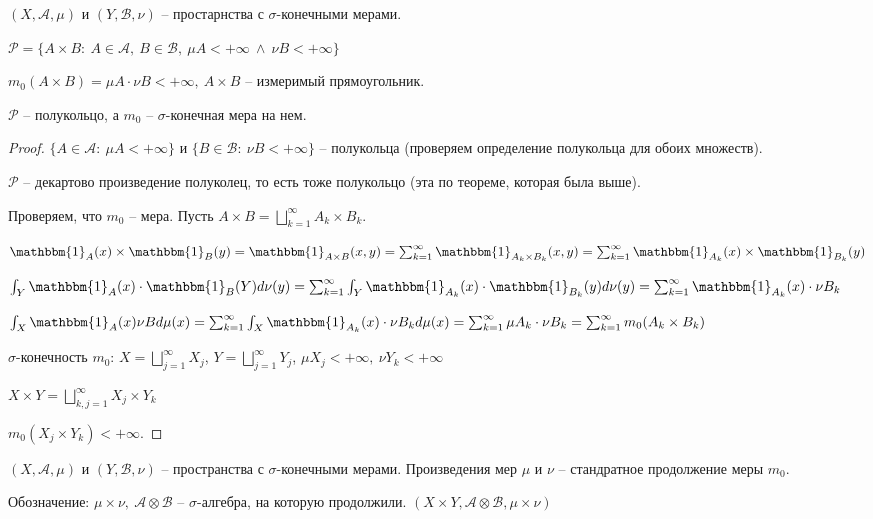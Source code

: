 \begin{definition}
    $\left(X, \mathcal{A}, \mu\right)$ и $\left(Y, \mathcal{B}, \nu\right)$ -- простарнства с $\sigma$-конечными мерами.

    $\mathcal{P} = \{ A \times B : \ A \in \mathcal{A}, \ B \in \mathcal{B}, \ \mu A < +\infty \  \land \ \nu B < +\infty \}$

    $m_0 (A \times B) = \mu A \cdot \nu B < +\infty, \ A \times B$ -- измеримый прямоугольник.
\end{definition}
\begin{theorem}
    $\mathcal{P}$ -- полукольцо, а $m_0$ -- $\sigma$-конечная мера на нем.
\end{theorem}
\begin{proof}
    $\{ A \in \mathcal{A}: \ \mu A < +\infty \}$ и $\{ B \in \mathcal{B}: \ \nu B < +\infty \}$ -- полукольца (проверяем определение полукольца для обоих множеств).

    $\mathcal{P}$ -- декартово произведение полуколец, то есть тоже полукольцо (эта по теореме, которая была выше).

    Проверяем, что $m_0$ -- мера. Пусть $A \times B = \bigsqcup_{k=1}^{\infty} A_k \times B_k$.

    $\mathbbm{1}_A(x) \times \mathbbm{1}_B(y) = \mathbbm{1}_{A \times B} (x, y) = \sum_{k=1}^{\infty} \mathbbm{1}_{A_k \times B_k} (x, y) = \sum_{k=1}^{\infty} \mathbbm{1}_{A_k}(x) \times \mathbbm{1}_{B_k}(y)$

    $\int_Y {\mathbbm{1}_A(x) \cdot \mathbbm{1}_B(Y) d \nu (y)} = \sum_{k=1}^{\infty} \int_Y{\mathbbm{1}_{A_k}(x) \cdot \mathbbm{1}_{B_k}(y) d \nu (y)} = \sum_{k=1}^{\infty} \mathbbm{1}_{A_k} (x) \cdot \nu B_k$

    $\int_X {\mathbbm{1}_A(x) \nu B d \mu(x)} = \sum_{k=1}^{\infty} \int_{X} {\mathbbm{1}_{A_k}(x) \cdot \nu B_k d \mu (x)} = \sum_{k=1}^{\infty} \mu A_k \cdot \nu B_k = \sum_{k=1}^{\infty} m_0 (A_k \times B_k)$

    $\sigma$-конечность $m_0$: $X = \bigsqcup_{j=1}^{\infty} X_j$, $Y = \bigsqcup_{j=1}^{\infty} Y_j$, $\mu X_j < +\infty, \ \nu Y_k < +\infty$

    $X \times Y = \bigsqcup_{k, j = 1}^{\infty} X_j \times Y_k$

    $m_0 (X_j \times Y_k) < +\infty$.
\end{proof}

\begin{definition}
    $(X, \mathcal{A}, \mu)$ и $(Y, \mathcal{B}, \nu)$ -- пространства с $\sigma$-конечными мерами. Произведения мер $\mu$ и $\nu$ -- стандратное продолжение меры $m_0$.

    Обозначение: $\mu \times \nu, \ \mathcal{A} \otimes \mathcal{B}$ -- $\sigma$-алгебра, на которую продолжили. $(X \times Y, \mathcal{A} \otimes \mathcal{B}, \mu \times \nu)$
\end{definition}

